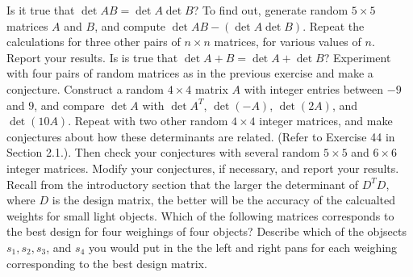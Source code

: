\documentclass[11pt,answers]{exam} %
\newcommand{\mat}[1]{\begin{bmatrix*}[r] #1 \end{bmatrix*}}
\begin{document}
\begin{questions}
    \question Is it true that $\det{AB}=\det{A}\det{B}$? To find out, generate random $5\times 5$ matrices $A$ and $B$, and compute $\det{AB}-(\det{A}\det{B})$. Repeat the calculations for three other pairs of $n \times n$ matrices, for various values of $n$. Report your results.
    \question Is is true that $\det{A+ B}=\det{A} + \det{B}$? Experiment with four pairs of random matrices as in the previous exercise and make a conjecture.
    \question Construct a random $4 \times 4$ matrix $A$ with integer entries between $-9$ and $9$, and compare $\det{A}$ with $\det{A^T}$, $\det{(-A)}$, $\det{(2A)}$, and $\det{(10A)}$. Repeat with two other random $4 \times 4$ integer matrices, and make conjectures about how these determinants are related. (Refer to Exercise 44 in Section 2.1.). Then check your conjectures with several random $5\times 5$ and $6 \times 6$ integer matrices. Modify your conjectures, if necessary, and report your results.
    \question Recall from the introductory section that the larger the determinant of $D^TD$, where $D$ is the design matrix, the better will be the accuracy of the calcualted weights for small light objects. Which of the following matrices corresponds to the best design for four weighings of four objects? Describe which of the objsects $s_1, s_2, s_3$, and $s_4$ you would put in the the left and right pans for each weighing corresponding to the best design matrix.
\end{questions} 
\end{document}
